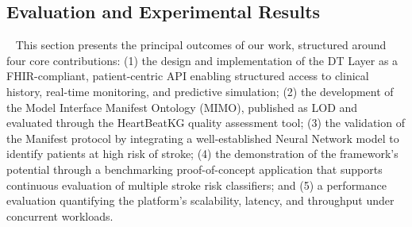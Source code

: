 %
%
\subsection{Evaluation and Experimental Results}~\label{sec:paper6_evaluation}
This section presents the principal outcomes of our work, structured around four core contributions: (1) the design and implementation of the DT Layer as a FHIR-compliant, patient-centric API enabling structured access to clinical history, real-time monitoring, and predictive simulation; (2) the development of the Model Interface Manifest Ontology (MIMO), published as LOD and evaluated through the HeartBeatKG quality assessment tool; (3) the validation of the Manifest protocol by integrating a well-established Neural Network model to identify patients at high risk of stroke; (4) the demonstration of the framework’s potential through a benchmarking proof-of-concept application that supports continuous evaluation of multiple stroke risk classifiers;
and (5) a performance evaluation quantifying the platform’s scalability, latency, and throughput under concurrent workloads.
